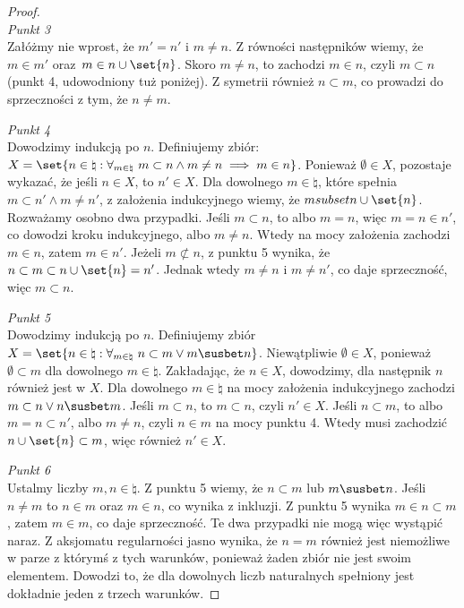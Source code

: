 \begin{proof}
    \textit{\\Punkt 3}\\
    Załóżmy nie wprost, że \( m' = n' \) i \( m \ne n \). Z równości następników wiemy, że \( m \in m' \) oraz~\( m \in n \cup \set{n} \).
    Skoro \( m \ne n \), to zachodzi \( m \in n \), czyli \( m \subset n \) (punkt 4, udowodniony tuż poniżej). Z symetrii również \( n \subset m \), co prowadzi do sprzeczności z tym, że \( n \ne m \).

    \textit{Punkt 4}\\
    Dowodzimy indukcją po \( n \). Definiujemy zbiór: \( X = \set{n \in \natural : \forall_{m \in \natural} \ m \subset n \land m \ne n \implies m \in n} \). Ponieważ \( \emptyset \in X \), pozostaje wykazać, że jeśli \( n \in X \), to \( n' \in X \).
    Dla dowolnego \( m \in \natural \), które spełnia \( m \subset n' \land m \ne n' \), z założenia indukcyjnego wiemy, że \( msubset n \cup \set{n} \).
    Rozważamy osobno dwa przypadki. Jeśli \( m \subset n \), to albo \( m = n \), więc \( m = n \in n' \), co dowodzi kroku indukcyjnego, albo \( m \ne n \). Wtedy na mocy założenia zachodzi \( m \in n \), zatem  \( m \in n' \).
    Jeżeli \( m \not\subset n \), z punktu 5 wynika, że \( n \subset m \subset n \cup \set{n} = n' \). Jednak wtedy \( m \ne n \) i \( m \ne n' \), co daje sprzeczność, więc \( m \subset n \).

    \textit{Punkt 5}\\
    Dowodzimy indukcją po \( n \). Definiujemy zbiór \( X = \set{n \in \natural : \forall_{m \in \natural} \ n \subset m \lor m \susbet n} \).
    Niewątpliwie \( \emptyset \in X \), ponieważ \( \emptyset \subset m \) dla dowolnego \( m \in \natural \). Zakładając, że \( n \in X \), dowodzimy, dla następnik \( n \) również jest w \( X \).
    Dla dowolnego \( m \in \natural \) na mocy założenia indukcyjnego zachodzi \( m \subset n \lor n \susbet m \). Jeśli \( m \subset n \), to \( m \subset n \), czyli \( n' \in X \).
    Jeśli \( n \subset m \), to albo \( m = n \subset n' \), albo \( m \ne n \), czyli \( n \in m \) na mocy punktu 4. Wtedy musi zachodzić \( n \cup \set{n} \subset m \), więc również \( n' \in X \).

    \textit{Punkt 6}\\
    Ustalmy liczby \( m, n \in \natural \). Z punktu 5 wiemy, że \( n \subset m \) lub \( m \susbet n \). Jeśli \( n \ne m \) to \( n \in m \) oraz \( m \in n \), co wynika z inkluzji.
    Z punktu 5 wynika \( m \in n \subset m \), zatem \( m \in m \), co daje sprzeczność. Te dwa przypadki nie mogą więc wystąpić naraz. Z aksjomatu regularności jasno wynika, że \( n = m \) również jest niemożliwe w parze z którymś z tych warunków, ponieważ żaden zbiór nie jest swoim elementem.
    Dowodzi to, że dla dowolnych liczb naturalnych spełniony jest dokładnie jeden z trzech warunków.
\end{proof}